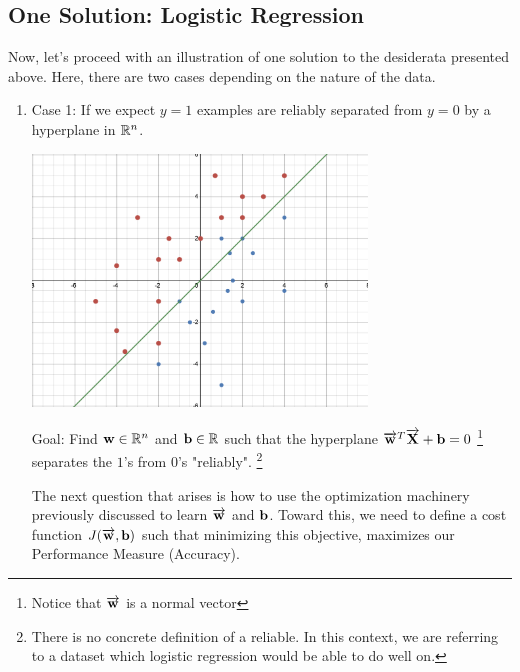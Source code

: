 \subsection{One Solution: Logistic Regression}
Now, let's proceed with an illustration of one solution to the desiderata presented above. Here, there are two cases depending on the nature of the data. 
\begin{enumerate}
    \item Case 1: If we expect $y = 1$ examples are reliably separated from $y = 0$ by a hyperplane in $\R^n$.
    
    \begin{center}
    \includegraphics[width=3.5in]{images/Chapter6/logreg_ex.png}
    \end{center}
    
    Goal: Find $\vw \in \R^{n}$ and $\vb \in \R$ such that the hyperplane $\overrightarrow{\vw}^T \overrightarrow{\MX} + \vb = 0$ \footnote{Notice that $\overrightarrow{\vw}$ is a normal vector} separates the $1$'s from $0$'s "reliably". \footnote{There is no concrete definition of a reliable. In this context, we are referring to a dataset which logistic regression would be able to do well on.}
    
    The next question that arises is how to use the optimization machinery previously discussed to learn $\overrightarrow{\vw}$ and $\vb$. Toward this, we need to define a cost function $J(\overrightarrow{\vw}, \vb)$ such that minimizing this objective, maximizes our Performance Measure (Accuracy).
    

\end{enumerate}

